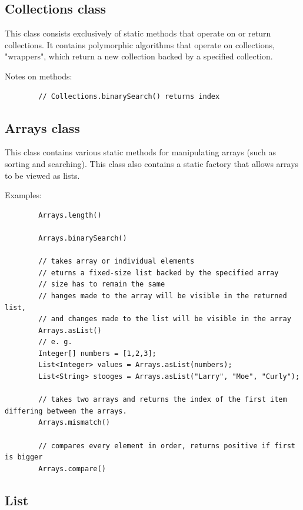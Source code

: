 \documentclass{scrartcl}
\begin{document}
\subsection{Collections class}

    This class consists exclusively of static methods that operate on or return collections. It contains polymorphic algorithms that operate on collections, "wrappers", which return a new collection backed by a specified collection.

    Notes on methods:

    \begin{lstlisting}
        // Collections.binarySearch() returns index

    \end{lstlisting}

\subsection{Arrays class}

    This class contains various static methods for manipulating arrays (such as sorting and searching). This class also contains a static factory that allows arrays to be viewed as lists.

    Examples:

    \begin{lstlisting}
        Arrays.length()

        Arrays.binarySearch()

        // takes array or individual elements
        // eturns a fixed-size list backed by the specified array
        // size has to remain the same
        // hanges made to the array will be visible in the returned list,
        // and changes made to the list will be visible in the array
        Arrays.asList()
        // e. g.
        Integer[] numbers = [1,2,3];
        List<Integer> values = Arrays.asList(numbers);
        List<String> stooges = Arrays.asList("Larry", "Moe", "Curly");

        // takes two arrays and returns the index of the first item differing between the arrays.
        Arrays.mismatch()

        // compares every element in order, returns positive if first is bigger
        Arrays.compare()

    \end{lstlisting}


\subsection{List}
\end{document}

